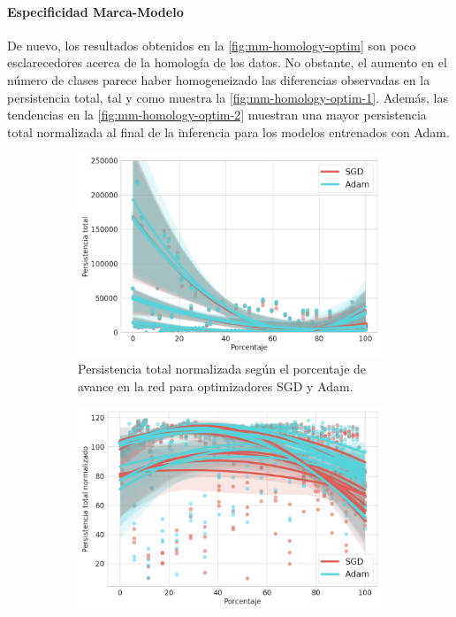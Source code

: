 \paragraph{Especificidad Marca-Modelo}

De nuevo, los resultados obtenidos en la \autoref{fig:mm-homology-optim} son poco
esclarecedores acerca de la homología de los datos. No obstante, el aumento en el
número de clases parece haber homogeneizado las diferencias observadas en la persistencia
total, tal y como muestra la \autoref{fig:mm-homology-optim-1}. Además, las
tendencias en la \autoref{fig:mm-homology-optim-2} muestran una mayor
persistencia total normalizada al final de la inferencia para los modelos
entrenados con Adam.

\begin{figure}[H]
	\centering
	\begin{subfigure}
		{.5\textwidth}
		\centering
		\includegraphics[width=\linewidth]{img/mm_optim.png}
		\caption{Persistencia total normalizada según el porcentaje de avance en la
			red para optimizadores SGD y Adam.}
		\label{fig:mm-homology-optim-1}
	\end{subfigure}%
	\begin{subfigure}
		{.5\textwidth}
		\centering
		\includegraphics[width=\linewidth]{img/mm_optim_norm.png}

\end{subfigure}
\end{figure}
